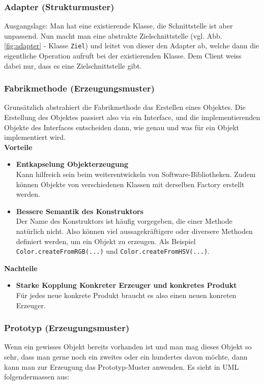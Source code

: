 \subsubsection{Adapter (Strukturmuster)}
Ausgangslage: Man hat eine existierende Klasse, die Schnittstelle ist aber unpassend. Nun macht man eine abstrakte Zielschnittstelle (vgl. Abb. \ref{fig:adapter} - Klasse \texttt{Ziel}) und leitet von dieser den Adapter ab, welche dann die eigentliche Operation aufruft bei der existierenden Klasse. Dem Client weiss dabei nur, dass es eine Zielschnittstelle gibt.

\subsubsection{Fabrikmethode (Erzeugungsmuster)}
Grunsätzlich abstrahiert die Fabrikmethode das Erstellen eines Objektes. Die Erstellung des Objektes passiert also via ein Interface, und die implementierenden Objekte des Interfaces entscheiden dann, wie genau und was für ein Objekt implementiert wird. \\
\textbf{Vorteile}
\begin{itemize}
  \item \textbf{Entkapselung Objekterzeugung} \\
  Kann hilfreich sein beim weiterentwickeln von Software-Bibliotheken. Zudem können Objekte von verschiedenen Klassen mit derselben Factory erstellt werden.
  \item \textbf{Bessere Semantik des Konstruktors} \\
  Der Name des Konstruktors ist häufig vorgegeben, die einer Methode natürlich nicht. Also können viel aussagekräftigere oder diversere Methoden definiert werden, um ein Objekt zu erzeugen. Als Beispiel \texttt{Color.createFromRGB(...)} und \texttt{Color.createFromHSV(...)}.
\end{itemize}
\textbf{Nachteile}
\begin{itemize}
  \item \textbf{Starke Kopplung Konkreter Erzeuger und konkretes Produkt} \\
  Für jedes neue konkrete Produkt braucht es also einen neuen konreten Erzeuger.
\end{itemize}



\subsubsection{Prototyp (Erzeugungsmuster)} 
Wenn ein gewisses Objekt bereits vorhanden ist und man mag dieses Objekt so sehr, dass man gerne noch ein zweites oder ein hundertes davon möchte, dann kann man zur Erzeugung das Prototyp-Muster anwenden. Es sieht in UML folgendermassen aus:

